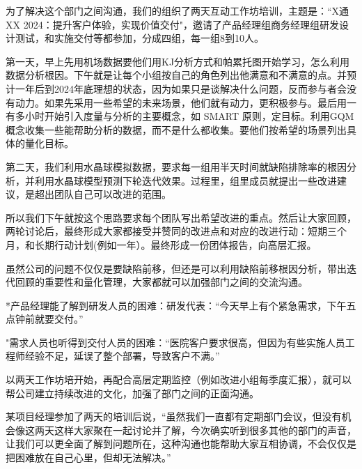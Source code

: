 为了解决这个部门之间沟通，我们的组织了两天互动工作坊培训，主题是：``X通XX
2024：提升客户体验，实现价值交付"，邀请了产品经理组商务经理组研发设计测试，和实施交付等都参加，分成四组，每一组8到10人。

第一天，早上先用机场数据要他们用KJ分析方式和帕累托图开始学习，怎么利用数据分析根因。下午就是让每个小组按自己的角色列出他满意和不满意的点。并预计一年后到2024年底理想的状态，因为如果只是谈解决什么问题，反而参与者会没有动力。如果先采用一些希望的未来场景，他们就有动力，更积极参与。最后用一有多小时开始引入度量与分析的主要概念，如
SMART
原则，定目标。利用GQM概念收集一些能帮助分析的数据，而不是什么都收集。要他们按希望的场景列出具体的量化目标。

第二天，我们利用水晶球模拟数据，要求每一组用半天时间就缺陷排除率的根因分析，并利用水晶球模型预测下轮迭代效果。过程里，组里成员就提出一些改进建议，是超出团队自己可以改进的范围。


所以我们下午就按这个思路要求每个团队写出希望改进的重点。然后让大家回顾，两轮讨论后，最终形成大家都接受并赞同的改进点和对应的改进行动：短期三个月，和长期行动计划(例如一年）。最终形成一份团体报告，向高层汇报。

虽然公司的问题不仅仅是要缺陷前移，但还是可以利用缺陷前移根因分析，带出迭代回顾的重要性和量化管理，大家都就可以加强部门之间的交流沟通。

*产品经理能了解到研发人员的困难：研发代表：“今天早上有个紧急需求，下午五点钟前就要交付。”

"需求人员也听得到交付人员的困难：“医院客户要求很高，但因为有些实施人员工程师经验不足，延误了整个部署，导致客户不满。”

以两天工作坊培开始，再配合高层定期监控（例如改进小组每季度汇报），就可以帮公司建立持续改进的文化，加强了部门之间的正面沟通。

某项目经理参加了两天的培训后说，``虽然我们一直都有定期部门会议，但没有机会像这两天这样大家聚在一起讨论并了解，今次确实听到很多其他的部门的声音，让我们可以更全面了解到问题所在，这种沟通也能帮助大家互相协调，不会仅仅是把困难放在自己心里，但却无法解决。''

